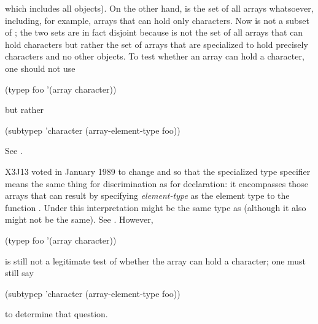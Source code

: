 \begin{flushdesc}
which includes all objects).  On the other hand, 
is the set of all arrays whatsoever, including, for example,
arrays that can hold only characters.  Now
 is not a subset of ; the two sets
are in fact disjoint because  is not the
set of all arrays that can hold characters but rather the set of
arrays that are specialized to hold precisely characters and no
other objects.  To test whether an array  can hold a character,
one should not use
\begin{lisp}
(typep foo '(array character))
\end{lisp}
but rather
\begin{lisp}
(subtypep 'character (array-element-type foo))
\end{lisp}
See .
\begin{new}
X3J13 voted in January 1989
to change  and 
so that the specialized  type specifier
means the same thing for discrimination
as for declaration: it encompasses those arrays
that can result by specifying \emph{element-type} as the element type
to the function .
Under this interpretation  might be
the same type as 
(although it also might not be the same).
See .
However,
\begin{lisp}
(typep foo '(array character))
\end{lisp}
is still not a legitimate test of whether the array
 can hold a character; one must still say
\begin{lisp}
(subtypep 'character (array-element-type foo))
\end{lisp}
to determine that question.


\end{new}
\end{flushdesc}
